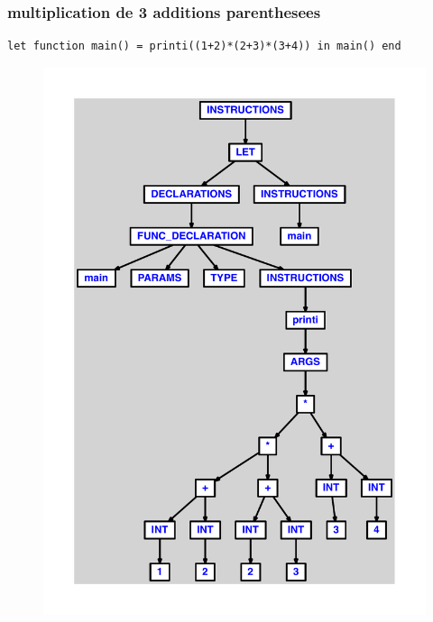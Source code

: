 \documentclass{article}
\begin{document}
\subsubsection{multiplication de 3 additions parenthesees}
\begin{lstlisting}
let function main() = printi((1+2)*(2+3)*(3+4)) in main() end
\end{lstlisting}
\newpage
\begin{figure}[H]
\centering
\includegraphics[max width=\textwidth]{ast/ast_104.pdf}
\end{figure}
\newpage
\end{document}
